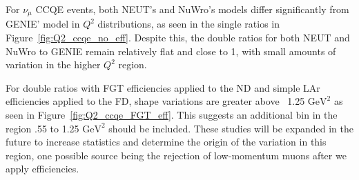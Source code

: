 \documentclass[12pt]{article}
\begin{document}

For $\nu_{\mu}$ CCQE events, both NEUT's and NuWro's models differ significantly from GENIE' model in $Q^2$ distributions, as seen in the single ratios in Figure~\ref{fig:Q2_ccqe_no_eff}. Despite this, the double ratios for both NEUT and NuWro to GENIE remain relatively flat and close to 1, with small amounts of variation in the higher $Q^2$ region.

For double ratios with FGT efficiencies applied to the ND and simple LAr efficiencies applied to the FD, shape variations are greater above ~1.25 $\textrm{GeV}^2$ as seen in Figure~\ref{fig:Q2_ccqe_FGT_eff}. This suggests an additional bin in the region .55 to 1.25 $\textrm{GeV}^2$ should be included. These studies will be expanded in the future to increase statistics and determine the origin of the variation in this region, one possible source being the rejection of low-momentum muons after we apply efficiencies.
\end{document}
